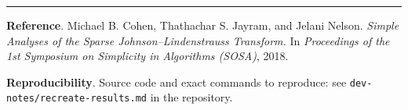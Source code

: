 \documentclass[11pt]{article}
\begin{document}
\bigskip
\hrule
\bigskip

\textbf{Reference}.
Michael B. Cohen, Thathachar S. Jayram, and Jelani Nelson. \emph{Simple Analyses of the Sparse Johnson--Lindenstrauss Transform.} In \emph{Proceedings of the 1st Symposium on Simplicity in Algorithms (SOSA)}, 2018.

\textbf{Reproducibility}. Source code and exact commands to reproduce: see \texttt{dev-notes/recreate-results.md} in the repository.
\end{document}
